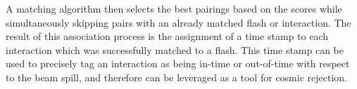 A matching algorithm then selects the best pairings based on the scores while simultaneously skipping pairs with an already matched flash or interaction. The result of this association process is the assignment of a time stamp to each interaction which was successfully matched to a flash. This time stamp can be used to precisely tag an interaction as being in-time or out-of-time with respect to the beam spill, and therefore can be leveraged as a tool for cosmic rejection.